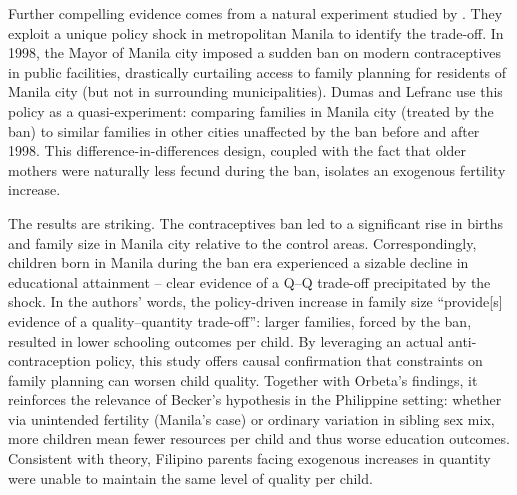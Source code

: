 \documentclass[]{AEA}
\begin{document}
Further compelling evidence comes from a natural experiment studied by
\citet{dumas2019sex}. They exploit a unique policy shock in metropolitan
Manila to identify the trade-off. In 1998, the Mayor of Manila city
imposed a sudden ban on modern contraceptives in public facilities,
drastically curtailing access to family planning for residents of Manila
city (but not in surrounding municipalities). Dumas and Lefranc use this
policy as a quasi-experiment: comparing families in Manila city (treated
by the ban) to similar families in other cities unaffected by the ban
before and after 1998. This difference-in-differences design, coupled
with the fact that older mothers were naturally less fecund during the
ban, isolates an exogenous fertility increase.

The results are striking. The contraceptives ban led to a significant
rise in births and family size in Manila city relative to the control
areas. Correspondingly, children born in Manila during the ban era
experienced a sizable decline in educational attainment -- clear
evidence of a Q--Q trade-off precipitated by the shock. In the authors'
words, the policy-driven increase in family size ``provide{[}s{]}
evidence of a quality--quantity trade-off'': larger families, forced by
the ban, resulted in lower schooling outcomes per child. By leveraging
an actual anti-contraception policy, this study offers causal
confirmation that constraints on family planning can worsen child
quality. Together with Orbeta's findings, it reinforces the relevance of
Becker's hypothesis in the Philippine setting: whether via unintended
fertility (Manila's case) or ordinary variation in sibling sex mix, more
children mean fewer resources per child and thus worse education
outcomes. Consistent with theory, Filipino parents facing exogenous
increases in quantity were unable to maintain the same level of quality
per child.
\end{document}
